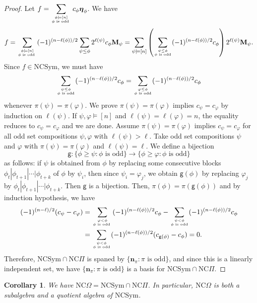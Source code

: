 \documentclass[11pt]{amsart}
\newtheorem{Corollary}[Theorem]{Corollary}
\numberwithin{equation}{section}
\newcommand{\NCSym}{\mathrm{NCSym}}
\newcommand{\NCPeak}{\mathrm{NC}\Pi}
\newcommand{\NCGamma}{\mathrm{NC}\Omega}
\newcommand{\boldeta}{{\boldsymbol{\eta}}}
\begin{document}
\begin{proof}
Let $f=\displaystyle\sum_{\phi\models [n] \atop \phi\text{ is odd }}c_\phi\boldeta_\phi$. We have
	$$f=\sum_{\phi\models [n] \atop \phi\text{ is odd }}(-1)^{(n-\ell(\phi))/2}\sum_{\psi\leq\phi}2^{\ell(\psi)}c_\phi\mathbf{M}_\psi=\sum_{\psi\models[n]}\left(\sum_{\psi\leq\phi \atop \phi\text{ is odd}}(-1)^{(n-\ell(\phi))/2}c_\phi\right)2^{\ell(\psi)}\mathbf{M}_\psi.$$
	Since $f\in\NCSym$, we must have
	$$\sum_{\psi\leq\phi \atop \phi\text{ is odd}}(-1)^{(n-\ell(\phi))/2}c_\phi=\sum_{\varphi\leq\phi \atop \phi\text{ is odd}}(-1)^{(n-\ell(\phi))/2}c_\phi$$
	whenever $\pi(\psi)=\pi(\varphi)$. We prove $\pi(\psi)=\pi(\varphi)$ implies $c_\psi=c_{\varphi}$ by induction on $\ell(\psi)$. If $\psi,\varphi\vDash[n]$ and $\ell(\psi)=\ell(\varphi)=n$, the equality reduces to $c_\psi=c_{\varphi}$ and we are done. Assume $\pi(\psi)=\pi(\varphi)$ implies $c_\psi=c_{\varphi}$ for all odd set compositions $\psi,\varphi$ with $\ell(\psi)>\ell$. Take odd set compositions $\psi$ and $\varphi$ with $\pi(\psi)=\pi(\varphi)$ and $\ell(\psi)=\ell$. We define a bijection $$\mathsf{g}:\{\phi\geq\psi:\phi\text{ is odd}\}\to\{\phi\geq\varphi:\phi\text{ is odd}\}$$ as follows: if $\psi$ is obtained from $\phi$ by replacing some consecutive blocks $\phi_t|\phi_{t+1}|\cdots|\phi_{t+k}$ of $\phi$ by $\psi_i$, then since $\psi_i=\varphi_j$, we obtain $\mathsf{g}(\phi)$ by replacing $\varphi_j$ by $\phi_t|\phi_{t+1}|\cdots|\phi_{t+k}$. Then $\mathsf{g}$ is a bijection. Then, $\pi(\phi)=\pi(\mathsf{g}(\phi))$ and by induction hypothesis, we have
	\begin{align*}
		(-1)^{(n-\ell)/2}(c_\psi-c_{\varphi})&=\sum_{\varphi<\phi \atop \phi\text{ is odd }}(-1)^{(n-\ell(\phi))/2}c_\phi-\sum_{\psi<\phi \atop \phi\text{ is odd}}(-1)^{(n-\ell(\phi))/2}c_\phi\\
		&=\sum_{\psi<\phi \atop \phi\text{ is odd}}(-1)^{(n-\ell(\phi))/2}(c_{\mathsf{g}(\phi)}-c_\phi)=0.
	\end{align*}
	Therefore, $\NCSym\cap\NCPeak$ is spaned by $\{\mathbf{n}_\pi:\pi\text{ is odd}\}$, and since this is a linearly independent set, we have $\{\mathbf{n}_\pi:\pi\text{ is odd}\}$ is a basis for $\NCSym\cap\NCPeak$. 
\end{proof} 
 


\begin{Corollary}\label{coro:NCGamma}
	We have $\NCGamma=\NCSym\cap \NCPeak$. In particular, $\NCGamma$ is both a subalgebra and a quotient algebra of $\NCSym$.
\end{Corollary}
\end{document}
